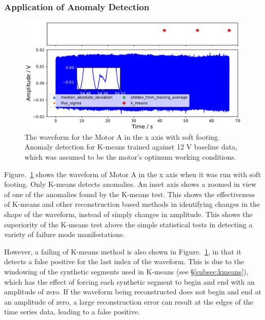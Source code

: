 \subsubsection{Application of Anomaly Detection}

\begin{figure}[t]
    \includegraphics[width=1.0\textwidth]{fig/large_unlevel_large_12V.pdf}
    \caption[Anomaly Tests Large Motor Uneven Footing]{The waveform for the Motor A in the x axis with soft footing. Anomaly detection for K-means trained against 12 V baseline data, which was assumed to be the motor's optimum working conditions.}
    \label{fig:large_uneven_footing}
\end{figure}

Figure.~\ref{fig:large_uneven_footing} shows the waveform of Motor A in the x axis when it was run with soft footing. Only K-means detects anomalies. An inset axis shows a zoomed in view of one of the anomalies found by the K-means test. This shows the effectiveness of K-means and other reconstruction based methods in identifying changes in the shape of the waveform, instead of simply changes in amplitude. This shows the superiority of the K-means test above the simple statistical tests in detecting a variety of failure mode manifestations. 

However, a failing of K-means method is also shown in Figure.~\ref{fig:large_uneven_footing}, in that it detects a false positive for the last index of the waveform. This is due to the windowing of the synthetic segments used in K-means (see \S\ref{subsec:kmeans}), which has the effect of forcing each synthetic segment to begin and end with an amplitude of zero. If the waveform being reconstructed does not begin and end at an amplitude of zero, a large reconstruction error can result at the edges of the time series data, leading to a false positive.


